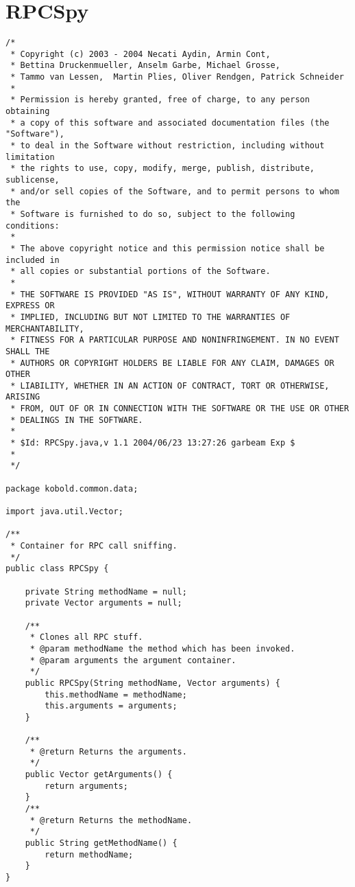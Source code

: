 \section{RPCSpy}
\small \begin{verbatim}
/*
 * Copyright (c) 2003 - 2004 Necati Aydin, Armin Cont, 
 * Bettina Druckenmueller, Anselm Garbe, Michael Grosse, 
 * Tammo van Lessen,  Martin Plies, Oliver Rendgen, Patrick Schneider
 * 
 * Permission is hereby granted, free of charge, to any person obtaining
 * a copy of this software and associated documentation files (the "Software"),
 * to deal in the Software without restriction, including without limitation
 * the rights to use, copy, modify, merge, publish, distribute, sublicense, 
 * and/or sell copies of the Software, and to permit persons to whom the 
 * Software is furnished to do so, subject to the following conditions:
 *
 * The above copyright notice and this permission notice shall be included in 
 * all copies or substantial portions of the Software.
 *
 * THE SOFTWARE IS PROVIDED "AS IS", WITHOUT WARRANTY OF ANY KIND, EXPRESS OR 
 * IMPLIED, INCLUDING BUT NOT LIMITED TO THE WARRANTIES OF MERCHANTABILITY, 
 * FITNESS FOR A PARTICULAR PURPOSE AND NONINFRINGEMENT. IN NO EVENT SHALL THE 
 * AUTHORS OR COPYRIGHT HOLDERS BE LIABLE FOR ANY CLAIM, DAMAGES OR OTHER 
 * LIABILITY, WHETHER IN AN ACTION OF CONTRACT, TORT OR OTHERWISE, ARISING 
 * FROM, OUT OF OR IN CONNECTION WITH THE SOFTWARE OR THE USE OR OTHER 
 * DEALINGS IN THE SOFTWARE.
 *
 * $Id: RPCSpy.java,v 1.1 2004/06/23 13:27:26 garbeam Exp $
 *
 */

package kobold.common.data;

import java.util.Vector;

/**
 * Container for RPC call sniffing.
 */
public class RPCSpy {
	
	private String methodName = null;
	private Vector arguments = null;
	
	/**
	 * Clones all RPC stuff.
	 * @param methodName the method which has been invoked.
	 * @param arguments the argument container.
	 */
	public RPCSpy(String methodName, Vector arguments) {
		this.methodName = methodName;
		this.arguments = arguments;
	}
	
	/**
	 * @return Returns the arguments.
	 */
	public Vector getArguments() {
		return arguments;
	}
	/**
	 * @return Returns the methodName.
	 */
	public String getMethodName() {
		return methodName;
	}
}
 
\end{verbatim}
